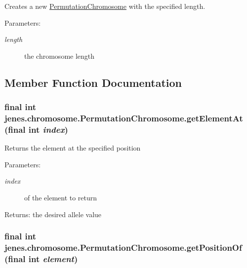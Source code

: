Creates a new \hyperlink{classjenes_1_1chromosome_1_1_permutation_chromosome}{PermutationChromosome} with the specified length.

\begin{Desc}
\item[Parameters:]
\begin{description}
\item[{\em length}]the chromosome length \end{description}
\end{Desc}


\subsection{Member Function Documentation}
\hypertarget{classjenes_1_1chromosome_1_1_permutation_chromosome_8c2aee80f46c4634d6797a346a6560cc}{
\subsubsection[getElementAt]{\setlength{\rightskip}{0pt plus 5cm}final int jenes.chromosome.PermutationChromosome.getElementAt (final int {\em index})}}
\label{classjenes_1_1chromosome_1_1_permutation_chromosome_8c2aee80f46c4634d6797a346a6560cc}


Returns the element at the specified position

\begin{Desc}
\item[Parameters:]
\begin{description}
\item[{\em index}]of the element to return \end{description}
\end{Desc}
\begin{Desc}
\item[Returns:]the desired allele value \end{Desc}
\hypertarget{classjenes_1_1chromosome_1_1_permutation_chromosome_0c8a75c9417def5db8724d22aadf0303}{
\subsubsection[getPositionOf]{\setlength{\rightskip}{0pt plus 5cm}final int jenes.chromosome.PermutationChromosome.getPositionOf (final int {\em element})}}
\label{classjenes_1_1chromosome_1_1_permutation_chromosome_0c8a75c9417def5db8724d22aadf0303}


